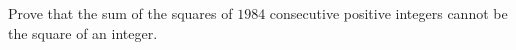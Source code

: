 Prove that the sum of the squares of $1984$ consecutive positive integers cannot be the square of an integer.